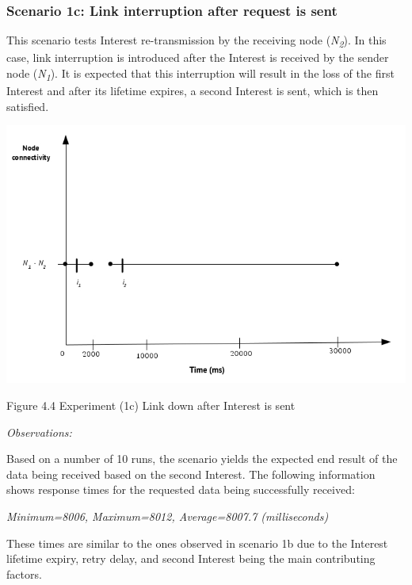 \documentclass[a4paper,12pt]{report}      %
\begin{document}
\subsubsection{Scenario 1c: Link interruption after request is sent}

This scenario tests Interest re-transmission by the receiving node (\emph{N\textsubscript{2}}). In this case, link interruption is introduced after the Interest is received by the sender node (\emph{N\textsubscript{1}}). It is expected that this interruption will result in the loss of the first Interest and after its lifetime expires, a second Interest is sent, which is then satisfied.

\noindent\includegraphics[scale=0.55]{exp1c_timediag.jpg}\newline
\begin{center}Figure 4.4 Experiment (1c) Link down after Interest is sent\end{center}

\vspace*{1\baselineskip}\noindent\emph{Observations:}

Based on a number of 10 runs, the scenario yields the expected end result of the data being received
based on the second Interest. The following information shows response times for the requested
data being successfully received:

\begin{center}\textsl{Minimum=8006, Maximum=8012, Average=8007.7 (milliseconds)}\end{center}

These times are similar to the ones observed in scenario 1b due to the Interest lifetime expiry,
retry delay, and second Interest being the main contributing factors.
\end{document}

